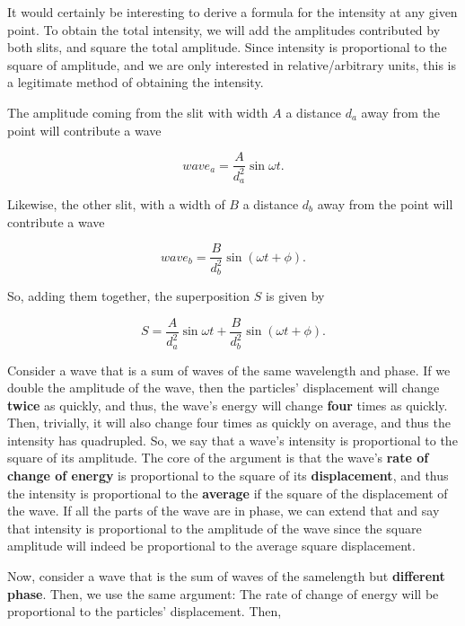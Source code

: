 \documentclass{paper}
\begin{document}
It would certainly be interesting to derive a formula for the intensity at any given point.
To obtain the total intensity, we will add the amplitudes contributed by
both slits, and square the total amplitude. Since intensity is proportional to the
square of amplitude, and we are only interested in relative/arbitrary units, this is a
legitimate method of obtaining the intensity.
            
    
The amplitude coming from the slit with width $A$ a distance $d_a$ away from the point
will contribute a wave
            
\begin{equation*}
    wave_{a} = \frac{A}{d_{a}^{2}}\sin{\omega{}t}.
\end{equation*}
            
Likewise, the other slit, with a width of $B$ a distance $d_{b}$ away from the point
will contribute a wave 
            
\begin{equation*}
    wave_{b} = \frac{B}{d_{b}^{2}}\sin(\omega{}t + \phi).
\end{equation*}
            
So, adding them together, the superposition $S$ is given by
            
\begin{equation}
\label{eq:S-of-t}
    S = \frac{A}{d_{a}^{2}}\sin{\omega{}t} + \frac{B}{d_{b}^{2}}\sin(\omega{}t + \phi).
\end{equation}
    
Consider a wave that is a sum of waves of the same wavelength and phase. If we double the amplitude of the wave, then the particles' displacement will change \textbf{twice} as quickly, and thus, the wave's energy will change \textbf{four} times as quickly. Then, trivially, it will also change four times as quickly on average, and thus the intensity has quadrupled. So, we say that a wave's intensity is proportional to the square of its amplitude. The core of the argument is that the wave's \textbf{rate of change of energy} is proportional to the square of its \textbf{displacement}, and thus the intensity is proportional to the \textbf{average} if the square of the displacement of the wave. If all the parts of the wave are in phase, we can extend that and say that intensity is proportional to the amplitude of the wave since the square amplitude will indeed be proportional to the average square displacement.

Now, consider a wave that is the sum of waves of the samelength but \textbf{different phase}. Then, we use the same argument: The rate of change of energy will be proportional to the particles' displacement. Then,
            
\end{document}
